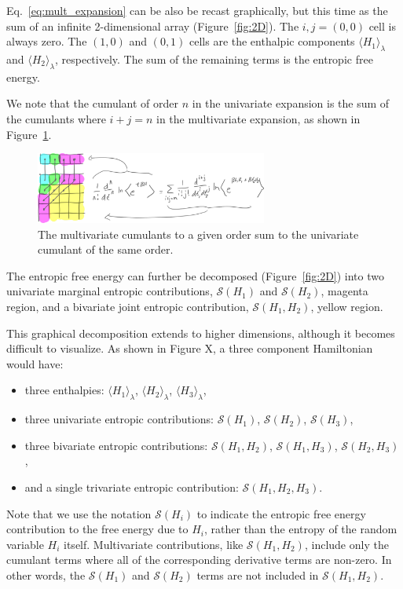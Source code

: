 \documentclass{article}
\begin{document}
Eq.~\ref{eq:mult_expansion} can be also be recast graphically, but this time as the sum of an infinite 2-dimensional array (Figure~\ref{fig:2D}). The $i,j=(0,0)$ cell is always zero. The $(1,0)$ and $(0,1)$ cells are the enthalpic components $\langle H_1 \rangle_\lambda$ and $\langle H_2 \rangle_\lambda$, respectively. The sum of the remaining terms is the entropic free energy. 

We note that the cumulant of order $n$ in the univariate expansion is the sum of the cumulants where $i+j=n$ in the multivariate expansion, as shown in Figure~\ref{fig:cumsum}.

\begin{figure}[htb]
\centering
\includegraphics[width=3in]{figure3.pdf}
\caption{The multivariate cumulants to a given order sum to the univariate cumulant of the same order.}
\label{fig:cumsum}
\end{figure}


The entropic free energy can further be decomposed (Figure~\ref{fig:2D}) into two univariate marginal entropic contributions, $\mathcal{S}(H_1)$ and $\mathcal{S}(H_2)$, magenta region, and a bivariate joint entropic contribution, $\mathcal{S}(H_1, H_2)$, yellow region.

This graphical decomposition extends to higher dimensions, although it becomes difficult to visualize. As shown in Figure X, a three component Hamiltonian would have:
\begin{itemize}
	\item three enthalpies: $\langle H_1 \rangle_\lambda$, $\langle H_2 \rangle_\lambda$, $\langle H_3 \rangle_\lambda$,
	\item three univariate entropic contributions: $\mathcal{S}(H_1)$, $\mathcal{S}(H_2)$, $\mathcal{S}(H_3)$,
	\item three bivariate entropic contributions: $\mathcal{S}(H_1, H_2)$, $\mathcal{S}(H_1, H_3)$, $\mathcal{S}(H_2, H_3)$, 
	\item and a single trivariate entropic contribution: $\mathcal{S}(H_1, H_2, H_3)$.
\end{itemize}

Note that we use the notation $\mathcal{S}(H_i)$ to indicate the entropic free energy contribution to the free energy due to $H_i$, rather than the entropy of the random variable $H_i$ itself. Multivariate contributions, like $\mathcal{S}(H_1, H_2)$, include only the cumulant terms where all of the corresponding derivative terms are non-zero. In other words, the $\mathcal{S}(H_1)$ and $\mathcal{S}(H_2)$ terms are not included in $\mathcal{S}(H_1, H_2)$.
\end{document}
